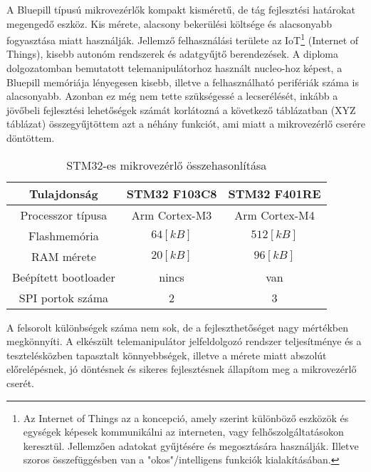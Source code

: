 A Bluepill típusú mikrovezérlők kompakt kisméretű, de tág fejlesztési határokat megengedő eszköz. Kis mérete, alacsony bekerülési költsége és alacsonyabb fogyasztása miatt használják. Jellemző felhasználási területe az IoT\footnote{Az Internet of Things az a koncepció, amely szerint különböző eszközök és egységek képesek kommunikálni az interneten, vagy felhőszolgáltatásokon keresztül. Jellemzően adatokat gyűjtésére és megosztására használják. Illetve szoros összefüggésben van a "okos"/intelligens funkciók kialakításában.} (Internet of Things), kisebb autonóm rendszerek és adatgyűjtő berendezések. A diploma dolgozatomban bemutatott telemanipulátorhoz használt nucleo-hoz képest, a Bluepill memóriája lényegesen kisebb, illetve a felhasználható perifériák száma is alacsonyabb. Azonban ez még nem tette szükségessé a lecserélését, inkább a jövőbeli fejlesztési lehetőségek számát korlátozná a következő táblázatban (XYZ táblázat) összegyűjtöttem azt a néhány funkciót, ami miatt a mikrovezérlő cserére döntöttem.

\begin{table}[!h]
\begin{center}
    \begin{tabular}{|c c c|} 
        \hline
        Tulajdonság & STM32 F103C8 & STM32 F401RE  \\ 
        \hline
        Processzor típusa     &  Arm Cortex-M3  &  Arm Cortex-M4  \\
        Flashmemória          & $64[kB]$        & $512[kB]$       \\
        RAM mérete            & $20[kB]$    	& $96[kB]$        \\
        Beépített bootloader  & nincs           & van             \\
        SPI portok száma      & 2               & 3               \\
        \hline
    \end{tabular}
    \caption{STM32-es mikrovezérlő összehasonlítása}
\end{center}
\end{table}

A felsorolt különbségek száma nem sok, de a fejleszthetőséget nagy mértékben megkönnyíti. A elkészült telemanipulátor jelfeldolgozó rendszer teljesítménye és a tesztelésközben tapasztalt könnyebbségek, illetve a mérete miatt abszolút előrelépésnek, jó döntésnek és sikeres fejlesztésnek állapítom meg a mikrovezérlő cserét.


